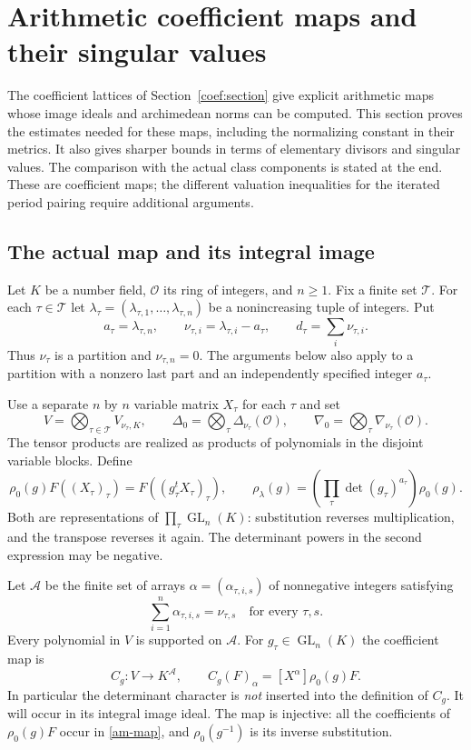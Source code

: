 \section{Arithmetic coefficient maps and their singular values}
\label{am-section}

The coefficient lattices of Section~\ref{coef:section} give explicit
arithmetic maps whose image ideals and archimedean norms can be computed.
This section proves the estimates needed for these maps, including the
normalizing constant in their metrics. It also gives sharper bounds in
terms of elementary divisors and singular values. The comparison with the
actual class components is stated at the end. These are coefficient maps;
the different valuation inequalities for the iterated period pairing
require additional arguments.\cite{alpo-uniform-source}

\subsection{The actual map and its integral image}

Let $K$ be a number field, $\mathcal O$ its ring of integers, and $n\ge1$.
Fix a finite set $\mathcal T$. For each $\tau\in\mathcal T$ let
$\lambda_\tau=(\lambda_{\tau,1},\ldots,\lambda_{\tau,n})$ be a
nonincreasing tuple of integers. Put
\[
 a_\tau=\lambda_{\tau,n},\qquad
 \nu_{\tau,i}=\lambda_{\tau,i}-a_\tau,\qquad
 d_\tau=\sum_i\nu_{\tau,i}.
\]
Thus $\nu_\tau$ is a partition and $\nu_{\tau,n}=0$.
The arguments below also apply to a partition with a nonzero last part
and an independently specified integer $a_\tau$.

Use a separate $n$ by $n$ variable matrix $X_\tau$ for each $\tau$ and set
\[
 V=\bigotimes_{\tau\in\mathcal T}V_{\nu_\tau,K},\qquad
 \Delta_0=\bigotimes_\tau\Delta_{\nu_\tau}(\mathcal O),\qquad
 \nabla_0=\bigotimes_\tau\nabla_{\nu_\tau}(\mathcal O).
\]
The tensor products are realized as products of polynomials in the
disjoint variable blocks. Define
\[
 \rho_0(g)F((X_\tau)_\tau)=F((g_\tau^tX_\tau)_\tau),\qquad
 \rho_\lambda(g)=\left(\prod_\tau\det(g_\tau)^{a_\tau}\right)\rho_0(g).
 \tag{AM1}\label{am-action}
\]
Both are representations of $\prod_\tau\operatorname{GL}_n(K)$:
substitution reverses multiplication, and the transpose reverses it
again. The determinant powers in the second expression may be negative.

Let $\mathcal A$ be the finite set of arrays
$\alpha=(\alpha_{\tau,i,s})$ of nonnegative integers satisfying
\[
             \sum_{i=1}^n\alpha_{\tau,i,s}=\nu_{\tau,s}
                       \quad\text{for every $\tau,s$}.
\]
Every polynomial in $V$ is supported on $\mathcal A$.
For $g_\tau\in\operatorname{GL}_n(K)$ the coefficient map is
\begin{equation}\label{am-map}
 C_g:V\longrightarrow K^{\mathcal A},\qquad
 C_g(F)_\alpha=[X^\alpha]\rho_0(g)F.
\end{equation}
In particular the determinant character is \emph{not} inserted into
the definition of $C_g$. It will occur in its integral image ideal.
The map is injective: all the coefficients of $\rho_0(g)F$ occur in
\eqref{am-map}, and $\rho_0(g^{-1})$ is its inverse substitution.

